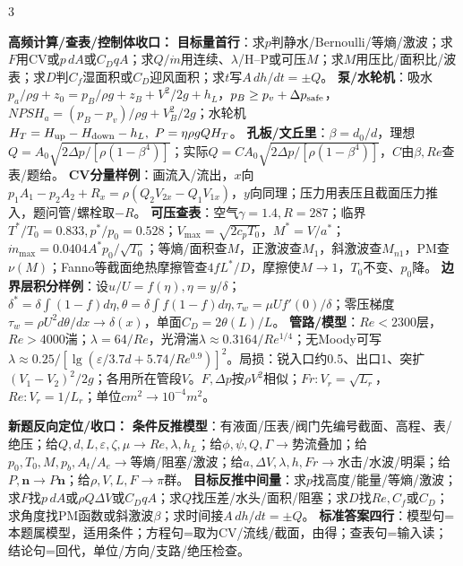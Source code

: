\documentclass[a4paper]{article}
\newcommand{\sect}[1]{\par{\bfseries\color{Q}#1：}}
\begin{document}
\begin{multicols}{3}
{\sect{高频计算/查表/控制体收口}
{\fontsize{4.35}{4.45}\selectfont
\textbf{目标量首行}：求$p$判静水/Bernoulli/等熵/激波；求$F$用CV或$p\,dA$或$C_DqA$；求$Q/\dot m$用连续、$\lambda$/H--P或可压$M$；求$M$用压比/面积比/波表；求$D$判$C_f$湿面积或$C_D$迎风面积；求$t$写$A\,dh/dt=\pm Q$。 
\textbf{泵/水轮机}：吸水$p_a/\rho g+z_0=p_B/\rho g+z_B+V^2/2g+h_L$，$p_B\ge p_v+\Delta p_{\rm safe}$，$NPSH_a=(p_B-p_v)/\rho g+V_B^2/2g$；水轮机$H_T=H_{\rm up}-H_{\rm down}-h_L,\ P=\eta\rho gQH_T$。 
\textbf{孔板/文丘里}：$\beta=d_0/d$，理想$Q=A_0\sqrt{2\Delta p/[\rho(1-\beta^4)]}$；实际$Q=C A_0\sqrt{2\Delta p/[\rho(1-\beta^4)]}$，$C$由$\beta,Re$查表/题给。 
\textbf{CV分量样例}：画流入/流出，$x$向$p_1A_1-p_2A_2+R_x=\rho(Q_2V_{2x}-Q_1V_{1x})$，$y$向同理；压力用表压且截面压力推入，题问管/螺栓取$-R$。 
\textbf{可压查表}：空气$\gamma=1.4,R=287$；临界$T^*/T_0=0.833,p^*/p_0=0.528$；$V_{\max}=\sqrt{2c_pT_0}$，$M^*=V/a^*$；$\dot m_{\max}=0.0404A^*p_0/\sqrt{T_0}$；等熵/面积查$M$，正激波查$M_1$，斜激波查$M_{n1}$，PM查$\nu(M)$；Fanno等截面绝热摩擦管查$4fL^*/D$，摩擦使$M\to1$，$T_0$不变、$p_0$降。 
\textbf{边界层积分样例}：设$u/U=f(\eta),\eta=y/\delta$；$\delta^*=\delta\int(1-f)d\eta,\theta=\delta\int f(1-f)d\eta,\tau_w=\mu Uf'(0)/\delta$；零压梯度$\tau_w=\rho U^2d\theta/dx\to\delta(x)$，单面$C_D=2\theta(L)/L$。 
\textbf{管路/模型}：$Re<2300$层，$Re>4000$湍；$\lambda=64/Re$，光滑湍$\lambda\approx0.3164/Re^{1/4}$；无Moody可写$\lambda\approx0.25/[\lg(\varepsilon/3.7d+5.74/Re^{0.9})]^2$。局损：锐入口约0.5、出口1、突扩$(V_1-V_2)^2/2g$；各用所在管段$V$。$F,\Delta p$按$\rho V^2$相似；$Fr:V_r=\sqrt{L_r}$，$Re:V_r=1/L_r$；单位$cm^2\to10^{-4}m^2$。}
\sect{新题反向定位/收口}
{\fontsize{4.43}{4.53}\selectfont
\textbf{条件反推模型}：有液面/压表/阀门先编号截面、高程、表/绝压；给$Q,d,L,\varepsilon,\zeta,\mu\to Re,\lambda,h_L$；给$\phi,\psi,Q,\Gamma\to$势流叠加；给$p_0,T_0,M,p_b,A_t/A_e\to$等熵/阻塞/激波；给$a,\Delta V,\lambda,h,Fr\to$水击/水波/明渠；给$P,\bm n\to P\bm n$；给$\rho,V,L,F\to\pi$群。 
\textbf{目标反推中间量}：求$p$找高度/能量/等熵/激波；求$F$找$p\,dA$或$\rho Q\Delta V$或$C_DqA$；求$Q$找压差/水头/面积/阻塞；求$D$找$Re,C_f$或$C_D$；求角度找PM函数或斜激波$\beta$；求时间接$A\,dh/dt=\pm Q$。 
\textbf{标准答案四行}：模型句=本题属\underline{\hspace{0.45cm}}模型，适用条件\underline{\hspace{0.45cm}}；方程句=取\underline{\hspace{0.4cm}}为CV/流线/截面，由\underline{\hspace{0.55cm}}得；查表句=输入\underline{\hspace{0.45cm}}读\underline{\hspace{0.45cm}}；结论句=回代，单位/方向/支路/绝压检查。 
}}
\end{multicols}
\end{document}
